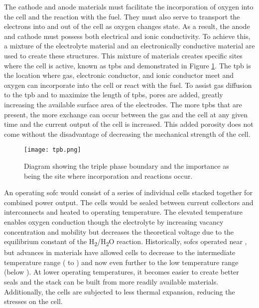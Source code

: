     The cathode and anode materials must facilitate the incorporation of oxygen into the cell and the reaction with the fuel.
    They must also serve to transport the electrons into and out of the cell as oxygen changes state.
    As a result, the anode and cathode must possess both electrical and ionic conductivity.
    To achieve this, a mixture of the electrolyte material and an electronically conductive material are used to create these structures.
    This mixture of materials creates specific sites where the cell is active, known as \glspl{tpb} and demonstrated in Figure \ref{fig:tpb}.
    The \gls{tpb} is the location where gas, electronic conductor, and ionic conductor meet and oxygen can incorporate into the cell or react with the fuel.
    To assist gas diffusion to the \gls{tpb} and to maximize the length of \glspl{tpb}, pores are added, greatly increasing the available surface area of the electrodes.
    The more \glspl{tpb} that are present, the more exchange can occur between the gas and the cell at any given time and the current output of the cell is increased.
    This added porosity does not come without the disadvantage of decreasing the mechanical strength of the cell.\cite{Pihlatie2009,Laurencin2010}
    \begin{figure}[p]
      \centering
      \texttt{[image: tpb.png]}
      \caption[Diagram showing the triple phase boundary and the importance as being the site where incorporation and reactions occur.]{Diagram showing the triple phase boundary and the importance as being the site where incorporation and reactions occur.\cite{Wachsman2011a}}\label{fig:tpb}
    \end{figure}

    An operating \gls{sofc} would consist of a series of individual cells stacked together for combined power output.
    The cells would be sealed between current collectors and interconnects and heated to operating temperature.
    The elevated temperature enables oxygen conduction though the electrolyte by increasing vacancy concentration and mobility but decreases the theoretical voltage due to the equilibrium constant of the H\textsubscript{2}/H\textsubscript{2}O reaction.
    Historically, \glspl{sofc} operated near , but advances in materials have allowed cells to decrease to the intermediate temperature range ( to ) and now even further to the low temperature range (below ).\cite{Wachsman2011a}
    At lower operating temperatures, it becomes easier to create better seals and the stack can be built from more readily available materials.
    Additionally, the cells are subjected to less thermal expansion, reducing the stresses on the cell.

